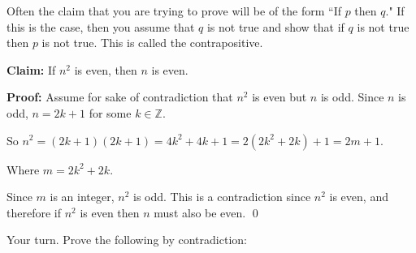 \documentclass[12pt,letterpaper]{article}
\newcommand\Z{\mathbb Z}
\begin{document}
	Often the claim that you are trying to prove will be of the form ``If $p$ then $q$." If this is the case, then you assume that $q$ is not true and show that if $q$ is not true then $p$ is not true.  This is called the contrapositive. 

      \textbf{Claim:} If $n^2$ is even, then $n$ is even.

      \textbf{Proof:} Assume for sake of contradiction that $n^2$ is even but $n$ is odd. Since $n$ is odd, $n = 2k+1$ for some $k \in \Z$.

      So $n^2 = (2k+1)(2k+1) = 4k^2 + 4k + 1 = 2(2k^2 + 2k) + 1 = 2m+1$.

      Where $m =  2k^2 + 2k$.

      Since $m$ is an integer, $n^2$ is odd. This is a contradiction since $n^2$ is even, and therefore if $n^2$ is even then $n$ must also be even. \qed


      Your turn. Prove the following by contradiction:
\end{document}
